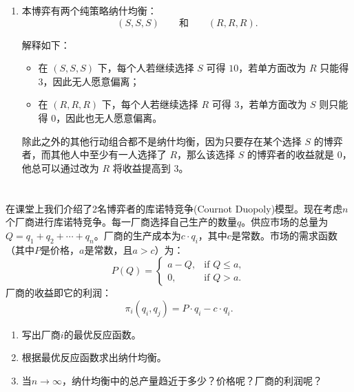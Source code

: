 \documentclass[12pt,a4paper]{article}
\begin{document}
\begin{enumerate}[label=\alph*.]
  由于该博弈是对称的，博弈者2和博弈者3的最优反应完全类似：
  \[
  BR_2(S,S)=S,\qquad
  BR_2(S,R)=R,\qquad BR_2(R,S)=R,\qquad BR_2(R,R)=R,
  \]
  \[
  BR_3(S,S)=S,\qquad
  BR_3(S,R)=R,\qquad BR_3(R,S)=R,\qquad BR_3(R,R)=R.
  \]

  也就是说：对任何一个博弈者而言，只有当另外两人都捕鹿时，自己捕鹿才是最优反应；只要另外两人中有一人捕兔，自己捕兔就是最优反应。

  \item
  本博弈有两个纯策略纳什均衡：
  \[
  (S,S,S)\qquad \text{和}\qquad (R,R,R).
  \]

  解释如下：
  \begin{itemize}
    \item 在 \((S,S,S)\) 下，每个人若继续选择 \(S\) 可得 \(10\)，若单方面改为 \(R\) 只能得 \(3\)，因此无人愿意偏离；
    \item 在 \((R,R,R)\) 下，每个人若继续选择 \(R\) 可得 \(3\)，若单方面改为 \(S\) 则只能得 \(0\)，因此也无人愿意偏离。
  \end{itemize}

  除此之外的其他行动组合都不是纳什均衡，因为只要存在某个选择 \(S\) 的博弈者，而其他人中至少有一人选择了 \(R\)，那么该选择 \(S\) 的博弈者的收益就是 \(0\)，他总可以通过改为 \(R\) 将收益提高到 \(3\)。
\end{enumerate}

\section{}
在课堂上我们介绍了2名博弈者的库诺特竞争(Cournot Duopoly)模型。现在考虑$n$个厂商进行库诺特竞争。每一厂商选择自己生产的数量$q$。供应市场的总量为$Q=q_1+q_2+\cdots+q_n$。厂商的生产成本为$c\cdot q_i$，其中$c$是常数。市场的需求函数（其中$P$是价格，$a$是常数，且$a>c$）为：
\[
  P(Q)=
  \begin{cases}
    a-Q, & \text{if } Q\le a,\\
    0, & \text{if } Q>a.
  \end{cases}
\]
厂商的收益即它的利润：
\[
  \pi_i(q_i,q_j)= P\cdot q_i - c\cdot q_i.
\]

\begin{enumerate}[label=\alph*.]
  \item 写出厂商$i$的最优反应函数。
  \item 根据最优反应函数求出纳什均衡。
  \item 当$n\to\infty$，纳什均衡中的总产量趋近于多少？价格呢？厂商的利润呢？
\end{enumerate}
\end{document}
